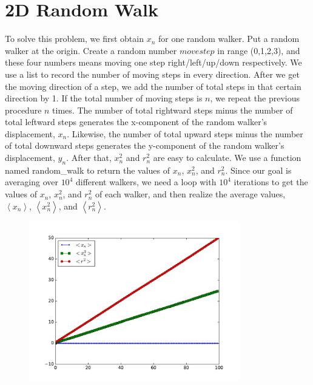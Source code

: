 \documentclass{article}
\begin{document}
\section{2D Random Walk}
To solve this problem, we first obtain $x_{n}$ for one random walker. Put a
random walker at the origin. Create a random number $movestep$ in range
(0,1,2,3), and these four numbers means moving one step right/left/up/down
respectively. We use a list to record the number of moving steps in every
direction. After we get the moving direction of a step, we add the number of
total steps in that certain direction by 1. If the total number of moving
steps is $n$, we repeat the previous procedure $n$ times. The number of
total rightward steps minus the number of total leftward steps generates the
x-component of the random walker's displacement, $x_{n}$. Likewise, the
number of total upward steps minus the number of total downward steps
generates the y-component of the random walker's displacement, $y_{n}$. 
After that, $x_{n}^{2}$ and $r_{n}^{2}$ are easy to calculate. We use a
function named random\_walk to return the values of $x_{n}$,  $x_{n}^{2}$,
and $r_{n}^{2}$. Since our goal is averaging over $10^{4}$ different
walkers, we need a loop with $10^{4}$ iterations to get the values of $%
x_{n}$, $x_{n}^{2}$, and $r_{n}^{2}$ of each walker, and then realize the
average values, $\left\langle x_{n}\right\rangle $, $\left\langle
x_{n}^{2}\right\rangle $, and $\left\langle r_{n}^{2}\right\rangle $. 
\begin{figure}[!ht]
	\centering
	\includegraphics[width=0.82\textwidth, clip]{RandomWalk.pdf}
	\caption{}
\end{figure}
\end{document}
